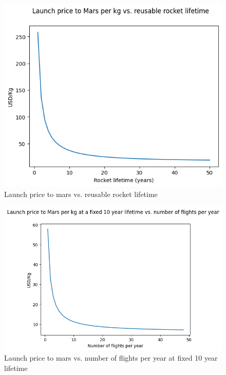 \documentclass[fleqn,10pt]{Stylesheet} %
\begin{document}
\begin{figure}
    \centering
    \includegraphics[width=\linewidth]{fig_reuse.png}
    \caption{Launch price to mars vs. reusable rocket lifetime}
    \label{fig:reuse}
\end{figure}

\begin{figure}
    \centering
    \includegraphics[width=\linewidth]{fig_numflights.png}
    \caption{Launch price to mars vs. number of flights per year at fixed 10 year lifetime}
    \label{fig:numflights}
\end{figure}
\end{document}
